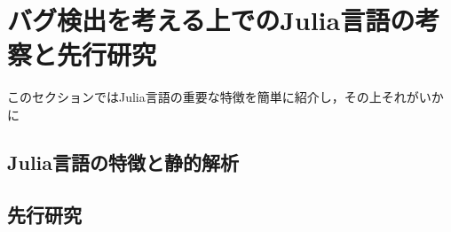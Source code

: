
\section{バグ検出を考える上でのJulia言語の考察と先行研究}

このセクションではJulia言語の重要な特徴を簡単に紹介し，その上それがいかに

\subsection{Julia言語の特徴と静的解析}

\subsection{先行研究}

